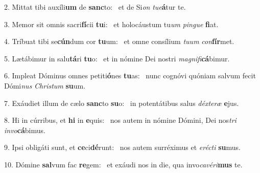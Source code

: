 2. Mittat tibi auxíli\textbf{um} de \textbf{sanc}to: \ast\  et de Si\textit{on} \textit{tu}\textit{e}\textbf{á}tur te.\

3. Memor sit omnis sacri\textbf{fí}cii \textbf{tu}i: \ast\  et holocáustum tu\textit{um} \textit{pin}\textit{gue} \textbf{fi}at.\

4. Tríbuat tibi se\textbf{cún}dum cor \textbf{tu}um: \ast\  et omne consílium \textit{tu}\textit{um} \textit{con}\textbf{fír}met.\

5. Lætábimur in salu\textbf{tá}ri \textbf{tu}o: \ast\  et in nómine Dei nostri \textit{ma}\textit{gni}\textit{fi}\textbf{cá}bimur.\

6. Impleat Dóminus omnes petiti\textbf{ó}nes \textbf{tu}as: \ast\  nunc cognóvi quóniam salvum fecit Dómi\textit{nus} \textit{Chris}\textit{tum} \textbf{su}um.\

7. Exáudiet illum de cælo \textbf{sanc}to \textbf{su}o: \ast\  in potentátibus salus \textit{déx}\textit{te}\textit{ræ} \textbf{e}jus.\

8. Hi in cúrribus, et \textbf{hi} in \textbf{e}quis: \ast\  nos autem in nómine Dómini, Dei nos\textit{tri} \textit{in}\textit{vo}\textbf{cá}bimus.\

9. Ipsi obligáti sunt, et \textbf{ce}ci\textbf{dé}runt: \ast\  nos autem surréximus et \textit{e}\textit{réc}\textit{ti} \textbf{su}mus.\

10. Dómine \textbf{sal}vum fac \textbf{re}gem: \ast\  et exáudi nos in die, qua invo\textit{ca}\textit{vé}\textit{ri}\textbf{mus} te.\

